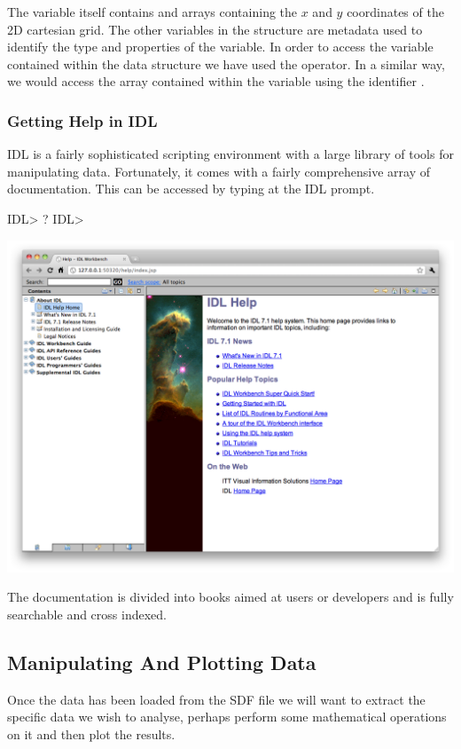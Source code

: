   The  variable itself contains  and  arrays
  containing the $x$ and $y$ coordinates of the 2D cartesian grid. The
  other variables in the  structure are metadata used to identify
  the type and properties of the variable.
  In order to access the  variable contained within the
   data structure we have used the  operator.
  In a similar way, we would access the  array contained within
  the  variable using the identifier .

\subsubsection{Getting Help in IDL}
  IDL is a fairly sophisticated scripting environment with a large
  library of tools for manipulating data. Fortunately, it comes with a
  fairly comprehensive array of documentation. This can be accessed by
  typing  at the IDL prompt.

\begin{boxverbatim}
IDL> ?
IDL>
\end{boxverbatim}
  \begin{center}
    \includegraphics[width=0.8\linewidth]{images/idl_help}
  \end{center}

  The documentation is divided into books aimed at users or developers and
  is fully searchable and cross indexed.

\subsection{Manipulating And Plotting Data}
  Once the data has been loaded from the SDF file we will want to extract
  the specific data we wish to analyse, perhaps perform some mathematical
  operations on it and then plot the results.

